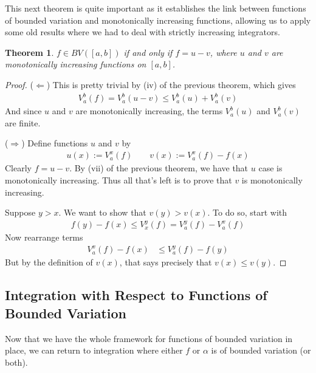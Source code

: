 \documentclass[12pt]{book}
\numberwithin{equation}{section} %
\theoremstyle{plain}
\newtheorem{thm}{Theorem}[section]
\theoremstyle{definition}
\theoremstyle{remark}
\begin{document}
\clearpage

This next theorem is quite important as it establishes the link between
functions of bounded variation and monotonically increasing functions,
allowing us to apply some old results where we had to deal with strictly
increasing integrators.

\begin{thm}
\label{monot}
$f\in BV([a,b])$ if and only if $f = u-v$, where $u$ and $v$ are
monotonically increasing functions on $[a,b]$.
\end{thm}
\begin{proof}
($\Leftarrow$)
This is pretty trivial by (iv) of the previous theorem, which gives
\begin{align*}
  V_a^b(f) = V_a^b(u-v) \leq V_a^b(u) + V_a^b(v)
\end{align*}
And since $u$ and $v$ are monotonically increasing, the terms $V_a^b(u)$
and $V_a^b(v)$ are finite.

($\Rightarrow$)
Define functions $u$ and $v$ by
\begin{align*}
  u(x) := V_a^x(f)
  \qquad
  v(x):=V_a^x(f) - f(x)
\end{align*}
Clearly $f = u-v$.
By (vii) of the previous theorem,
we have that $u$ case is monotonically increasing.
Thus all that's left is to prove that $v$ is monotonically
increasing.

Suppose $y>x$. We want to show that $v(y) > v(x)$.
To do so, start with
\begin{align*}
    f(y) - f(x) \leq V_x^y(f)
    = V_a^y(f) - V_a^x(f)
\end{align*}
Now rearrange terms
\begin{align*}
    V_a^x(f) - f(x) &\leq V_a^y(f) - f(y)
\end{align*}
But by the definition of $v(x)$, that says precisely that $v(x)\leq
v(y)$.
\end{proof}

\clearpage
\subsection{Integration with Respect to Functions of Bounded Variation}

Now that we have the whole framework for functions of bounded variation
in place, we can return to integration where either $f$ or $\alpha$ is
of bounded variation (or both).
\end{document}
